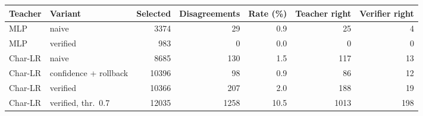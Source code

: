 \begin{tabular}{llrrrrr}
\toprule
Teacher & Variant & Selected & Disagreements & Rate (\%) & Teacher right & Verifier right \\
\midrule
MLP & naive & 3374 & 29 & 0.9 & 25 & 4 \\
MLP & verified & 983 & 0 & 0.0 & 0 & 0 \\
Char-LR & naive & 8685 & 130 & 1.5 & 117 & 13 \\
Char-LR & confidence + rollback & 10396 & 98 & 0.9 & 86 & 12 \\
Char-LR & verified & 10366 & 207 & 2.0 & 188 & 19 \\
Char-LR & verified, thr.\ 0.7 & 12035 & 1258 & 10.5 & 1013 & 198 \\
\bottomrule
\end{tabular}
